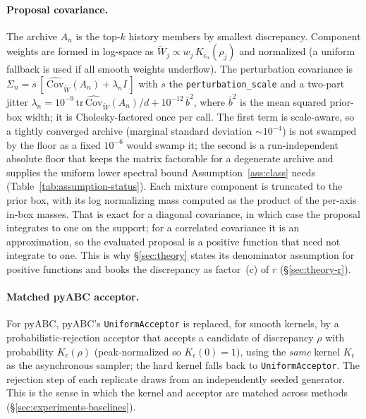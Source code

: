 \documentclass[10pt]{article}
\theoremstyle{plain}
\theoremstyle{definition}
\begin{document}
\paragraph{Proposal covariance.} The archive $A_n$ is the top-$k$ history members by smallest discrepancy. Component weights are formed in log-space as $\tilde W_j \propto w_j\,K_{\epsilon_n}(\rho_j)$ and normalized (a uniform fallback is used if all smooth weights underflow). The perturbation covariance is $\Sigma_n = s\,[\,\widehat{\mathrm{Cov}}_{\tilde W}(A_n) + \lambda_n I\,]$ with $s$ the \texttt{perturbation\_scale} and a two-part jitter $\lambda_n = 10^{-9}\,\mathrm{tr}\,\widehat{\mathrm{Cov}}_{\tilde W}(A_n)/d + 10^{-12}\,\bar b^2$, where $\bar b^2$ is the mean squared prior-box width; it is Cholesky-factored once per call. The first term is scale-aware, so a tightly converged archive (marginal standard deviation ${\sim}10^{-4}$) is not swamped by the floor as a fixed $10^{-6}$ would swamp it; the second is a run-independent absolute floor that keeps the matrix factorable for a degenerate archive and supplies the uniform lower spectral bound Assumption~\ref{ass:class} needs (Table~\ref{tab:assumption-status}). Each mixture component is truncated to the prior box, with its log normalizing mass computed as the product of the per-axis in-box masses. That is exact for a diagonal covariance, in which case the proposal integrates to one on the support; for a correlated covariance it is an approximation, so the evaluated proposal is a positive function that need not integrate to one. This is why \S\ref{sec:theory} states its denominator assumption for positive functions and books the discrepancy as factor~(c) of $r$ (\S\ref{sec:theory-r}).

\paragraph{Matched pyABC acceptor.} For pyABC, pyABC's \texttt{UniformAcceptor} is replaced, for smooth kernels, by a probabilistic-rejection acceptor that accepts a candidate of discrepancy $\rho$ with probability $K_{\epsilon}(\rho)$ (peak-normalized so $K_{\epsilon}(0)=1$), using the \emph{same} kernel $K_{\epsilon}$ as the asynchronous sampler; the hard kernel falls back to \texttt{UniformAcceptor}. The rejection step of each replicate draws from an independently seeded generator. This is the sense in which the kernel and acceptor are matched across methods (\S\ref{sec:experiments-baselines}).
\end{document}

